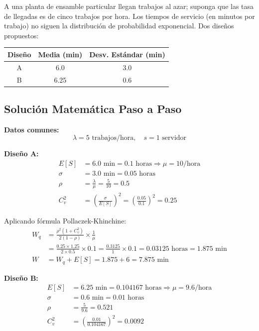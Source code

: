 \documentclass[12pt, a4paper, oneside]{book}
\theoremstyle{definition}
\begin{document}
A una planta de ensamble particular llegan trabajos al azar; suponga que las tasa de llegadas es de cinco trabajos por hora. Los tiempos de servicio (en minutos por trabajo) no siguen la distribución de probabilidad exponencial. Dos diseños propuestos:

\begin{center}
\begin{tabular}{|c|c|c|}
\hline
\textbf{Diseño} & \textbf{Media (min)} & \textbf{Desv. Estándar (min)} \\
\hline
A & 6.0 & 3.0 \\
B & 6.25 & 0.6 \\
\hline
\end{tabular}
\end{center}

\subsection{Solución Matemática Paso a Paso}

\textbf{Datos comunes:}
$$\lambda = 5 \text{ trabajos/hora}, \quad s = 1 \text{ servidor}$$

\textbf{Diseño A:}
\begin{align*}
E[S] &= 6.0 \text{ min} = 0.1 \text{ horas} \Rightarrow \mu = 10\text{/hora} \\
\sigma &= 3.0 \text{ min} = 0.05 \text{ horas} \\
\rho &= \frac{\lambda}{\mu} = \frac{5}{10} = 0.5 \\
C_v^2 &= \left(\frac{\sigma}{E[S]}\right)^2 = \left(\frac{0.05}{0.1}\right)^2 = 0.25
\end{align*}

Aplicando fórmula Pollaczek-Khinchine:
\begin{align*}
W_q &= \frac{\rho^2(1+C_v^2)}{2(1-\rho)} \times \frac{1}{\mu} \\
&= \frac{0.25 \times 1.25}{2 \times 0.5} \times 0.1 = \frac{0.3125}{1} \times 0.1 = 0.03125 \text{ horas} = 1.875 \text{ min} \\
W &= W_q + E[S] = 1.875 + 6 = 7.875 \text{ min}
\end{align*}

\textbf{Diseño B:}
\begin{align*}
E[S] &= 6.25 \text{ min} = 0.104167 \text{ horas} \Rightarrow \mu = 9.6\text{/hora} \\
\sigma &= 0.6 \text{ min} = 0.01 \text{ horas} \\
\rho &= \frac{5}{9.6} = 0.521 \\
C_v^2 &= \left(\frac{0.01}{0.104167}\right)^2 = 0.0092
\end{align*}
\end{document}
